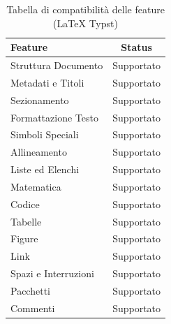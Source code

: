 \documentclass{article}
\begin{document}
    \begin{table}[ht]
        \centering
        \caption{Tabella di compatibilità delle feature (LaTeX \textrightarrow Typst)}

        \begin{tabular}{|l|c|}
            \hline
            \textbf{Feature} & \textbf{Status} \\ \hline
            Struttura Documento & Supportato \\ \hline
            Metadati e Titoli & Supportato \\ \hline
            Sezionamento & Supportato \\ \hline
            Formattazione Testo & Supportato \\ \hline
            Simboli Speciali & Supportato \\ \hline
            Allineamento & Supportato \\ \hline
            Liste ed Elenchi & Supportato \\ \hline
            Matematica & Supportato \\ \hline
            Codice & Supportato \\ \hline
            Tabelle & Supportato \\ \hline
            Figure & Supportato \\ \hline
            Link & Supportato \\ \hline
            Spazi e Interruzioni & Supportato \\ \hline
            Pacchetti & Supportato \\ \hline
            Commenti & Supportato \\ \hline
        \end{tabular}
    \end{table}

    \flushleft
\end{document}
